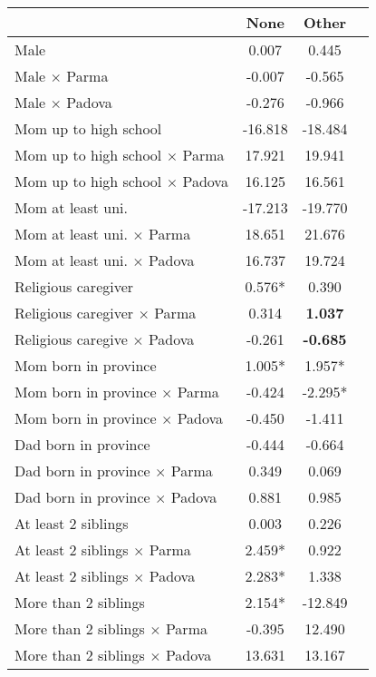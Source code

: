 \begin{tabular}{l c c c}
\toprule
& None & Other \\
\midrule
Male &     0.007 &     0.445 \\
Male $\times$ Parma &    -0.007 &    -0.565 \\
Male $\times$ Padova &    -0.276 &    -0.966 \\
Mom up to high school &   -16.818 &   -18.484 \\
Mom up to high school $\times$ Parma &    17.921 &    19.941 \\
Mom up to high school $\times$ Padova &    16.125 &    16.561 \\
Mom at least uni. &   -17.213 &   -19.770 \\
Mom at least uni. $\times$ Parma &    18.651 &    21.676 \\
Mom at least uni. $\times$ Padova &    16.737 &    19.724 \\
Religious caregiver & 0.576* &     0.390 \\
Religious caregiver $\times$ Parma &     0.314 & \textbf{    1.037} \\
Religious caregive $\times$ Padova &    -0.261 & \textbf{   -0.685} \\
Mom born in province & 1.005* & 1.957* \\
Mom born in province $\times$ Parma &    -0.424 & -2.295* \\
Mom born in province $\times$ Padova &    -0.450 &    -1.411 \\
Dad born in province &    -0.444 &    -0.664 \\
Dad born in province $\times$ Parma &     0.349 &     0.069 \\
Dad born in province $\times$ Padova &     0.881 &     0.985 \\
At least 2 siblings &     0.003 &     0.226 \\
At least 2 siblings $\times$ Parma & 2.459* &     0.922 \\
At least 2 siblings $\times$ Padova & 2.283* &     1.338 \\
More than 2 siblings & 2.154* &   -12.849 \\
More than 2 siblings $\times$ Parma &    -0.395 &    12.490 \\
More than 2 siblings $\times$ Padova &    13.631 &    13.167 \\
\bottomrule
\end{tabular}
